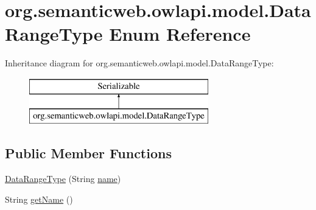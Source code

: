 \hypertarget{enumorg_1_1semanticweb_1_1owlapi_1_1model_1_1_data_range_type}{\section{org.\-semanticweb.\-owlapi.\-model.\-Data\-Range\-Type Enum Reference}
\label{enumorg_1_1semanticweb_1_1owlapi_1_1model_1_1_data_range_type}
}
Inheritance diagram for org.\-semanticweb.\-owlapi.\-model.\-Data\-Range\-Type\-:\begin{figure}[H]
\begin{center}
\leavevmode
\includegraphics[height=2.000000cm]{enumorg_1_1semanticweb_1_1owlapi_1_1model_1_1_data_range_type}
\end{center}
\end{figure}
\subsection*{Public Member Functions}
\begin{DoxyCompactItemize}
\item 
\hyperlink{enumorg_1_1semanticweb_1_1owlapi_1_1model_1_1_data_range_type_a2dfb4840ed51a5257d6b32a899f185c4}{Data\-Range\-Type} (String \hyperlink{enumorg_1_1semanticweb_1_1owlapi_1_1model_1_1_data_range_type_a517a0801c2111a656af0b526996d36b4}{name})
\item 
String \hyperlink{enumorg_1_1semanticweb_1_1owlapi_1_1model_1_1_data_range_type_a90d47e35eb53db3fe668682aa292970e}{get\-Name} ()
\end{DoxyCompactItemize}
